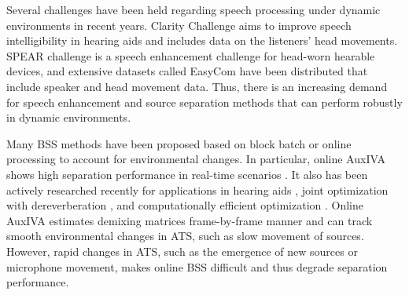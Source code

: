 \documentclass[sip,biber]{now-journal}
\begin{document}
Several challenges have been held regarding speech processing under dynamic environments in recent years.
Clarity Challenge \cite{Akeroyd:2023:ICASSP} aims to improve speech intelligibility in hearing aids and includes data on the listeners' head movements.
SPEAR challenge \cite{Guiraud:2022:IWAENC} is a speech enhancement challenge for head-worn hearable devices, and extensive datasets called EasyCom \cite{Donley:2021:arxiv} have been distributed that include speaker and head movement data.
Thus, there is an increasing demand for speech enhancement and source separation methods that can perform robustly in dynamic environments.

Many BSS methods have been proposed based on block batch \cite{Koldovsky:2019:ICASSP,Koldovsky:2021:SP,Jansky:2022:ASMP} or online processing \cite{Kim:2010:CASI,Taniguchi:2014:HSCMA} to account for environmental changes.
In particular, online AuxIVA shows high separation performance in real-time scenarios \cite{Taniguchi:2014:HSCMA}.
It also has been actively researched recently for applications in hearing aids \cite{Sunohara:2017:ICASSP}, joint optimization with dereverberation \cite{Ueda:2021:ICASSP}, and computationally efficient optimization \cite{Nakashima:2023:ICASSP}.
Online AuxIVA estimates demixing matrices frame-by-frame manner and can track smooth environmental changes in ATS, such as slow movement of sources.
However, rapid changes in ATS, such as the emergence of new sources or microphone movement, makes online BSS difficult and thus degrade separation performance.
\end{document}
